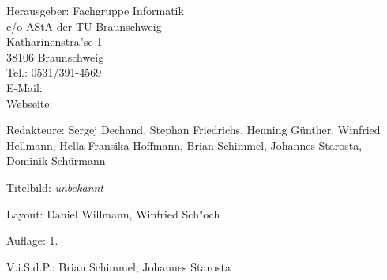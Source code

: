 
\begin{nimpressum}
\item[Herausgeber:]
	Fachgruppe Informatik\\
	c/o AStA der TU Braunschweig\\
	Katharinenstra"se 1\\
	38106 Braunschweig\\
	Tel.: 0531/391-4569\\
	E-Mail: \\
	Webseite: 
      \item[Redakteure:]
        Sergej Dechand,
        Stephan Friedrichs,
        Henning Günther,
        Winfried Hellmann,
        Hella-Fransika Hoffmann,
        Brian Schimmel,
        Johannes Starosta,
        Dominik Schürmann %
\item[Titelbild:]
	\textit{unbekannt}
\item[Layout:]
	Daniel Willmann, Winfried Sch"och

%
\item[Auflage:]
  1.
\item[V.i.S.d.P.:]  %
  Brian Schimmel, Johannes Starosta
\end{nimpressum}

